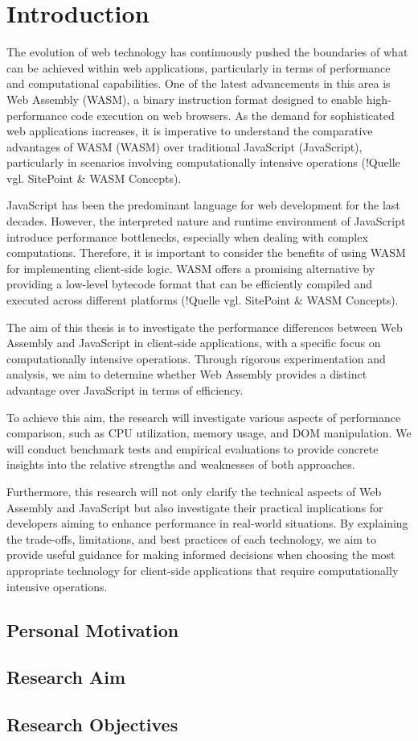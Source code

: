 \newpage

\section{Introduction} \label{introduction}
The evolution of web technology has continuously pushed the boundaries of what can be achieved within web applications, particularly in terms of performance and computational capabilities. One of the latest advancements in this area is Web Assembly (WASM), a binary instruction format designed to enable high-performance code execution on web browsers. As the demand for sophisticated web applications increases, it is imperative to understand the comparative advantages of WASM (WASM) over traditional JavaScript (JavaScript), particularly in scenarios involving computationally intensive operations (!Quelle vgl. SitePoint \& WASM Concepts).

JavaScript has been the predominant language for web development for the last decades. However, the interpreted nature and runtime environment of JavaScript introduce performance bottlenecks, especially when dealing with complex computations. Therefore, it is important to consider the benefits of using WASM for implementing client-side logic. WASM offers a promising alternative by providing a low-level bytecode format that can be efficiently compiled and executed across different platforms (!Quelle vgl. SitePoint \& WASM Concepts).

The aim of this thesis is to investigate the performance differences between Web Assembly and JavaScript in client-side applications, with a specific focus on computationally intensive operations. Through rigorous experimentation and analysis, we aim to determine whether Web Assembly provides a distinct advantage over JavaScript in terms of efficiency.

To achieve this aim, the research will investigate various aspects of performance comparison, such as CPU utilization, memory usage, and DOM manipulation. We will conduct benchmark tests and empirical evaluations to provide concrete insights into the relative strengths and weaknesses of both approaches.

Furthermore, this research will not only clarify the technical aspects of Web Assembly and JavaScript but also investigate their practical implications for developers aiming to enhance performance in real-world situations. By explaining the trade-offs, limitations, and best practices of each technology, we aim to provide useful guidance for making informed decisions when choosing the most appropriate technology for client-side applications that require computationally intensive operations.

\subsection{Personal Motivation} \label{motivation}

\subsection{Research Aim} \label{aim}

\subsection{Research Objectives} \label{objectives}

